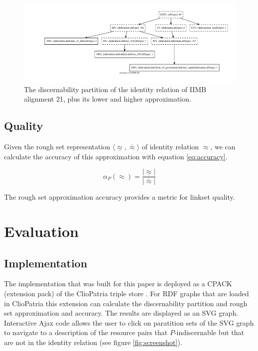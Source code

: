 \documentclass[letterpaper]{article}
\begin{document}
\begin{figure}
\label{fig:approximation_iimb}
\caption{The discernability partition of the identity relation of IIMB alignment 21, plus its lower and higher approximation.}
\includegraphics[scale=0.5]{iimb_approximation_example}
\end{figure}

\subsection{Quality}

Given the rough set representation $\langle \underline{\approx}, \overline{\approx} \rangle$ of identity relation $\approx$, we can calculate the accuracy of this approximation with equation \ref{eq:accuracy}.

\begin{equation}
\label{eq:accuracy}
\alpha_P(\approx) = \frac{\vert \underline{\approx} \vert}{\vert \overline{\approx} \vert}
\end{equation}

The rough set approximation accuracy provides a metric for linkset quality.

\section{Evaluation}
\label{sec:evaluation}

\subsection{Implementation}
\label{sec:implementation}

The implementation that was built for this paper is deployed as a CPACK (extension pack) of the ClioPatria triple store \cite{schreiber_2006}. For RDF graphs that are loaded in ClioPatria this extension can calculate the discernability partition and rough set approximation and accuracy. The results are displayed as an SVG graph. Interactive Ajax code allows the user to click on paratition sets of the SVG graph to navigate to a description of the resource pairs that $P$-indiscernable but that are not in the identity relation (see figure \ref{fig:screenshot}).
\end{document}
